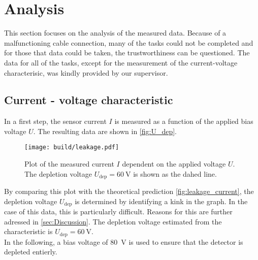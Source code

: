 \section{Analysis}
\label{sec:Analysis}
This section focuses on the analysis of the measured data. Because of a malfunctioning cable connection, many of the tasks could not be completed and for those
that data could be taken, the trustworthiness can be questioned. The data for all of the tasks, except for the measurement of the current-voltage characterisic,
was kindly provided by our supervisor.

\subsection{Current - voltage characteristic}
\label{sec:current-voltage characterisic}
In a first step, the sensor current $I$ is measured as a function of the applied bias voltage $U$. The resulting data are shown in \autoref{fig:U_dep}.
\begin{figure}
    \centering
    \texttt{[image: build/leakage.pdf]}
    \caption{Plot of the measured current $I$ dependent on the applied voltage $U$. The depletion voltage $U_{\mathrm{dep}} = \qty{60}{\volt}$ is shown as
    the dahed line.}
    \label{fig:U_dep}
\end{figure}
By comparing this plot with the theoretical prediction \autoref{fig:leakage_current}, the depletion voltage $U_{\mathrm{dep}}$ is determined by identifying a kink
in the graph. In the case of this data, this is particularly difficult. Reasons for this are further adressed in \autoref{sec:Discussion}. The depletion voltage
estimated from the characteristic is $U_\mathrm{dep} = \qty{60}{\volt}$.\\
In the following, a bias voltage of \qty{80}{\volt} is used to ensure that the detector is depleted entierly.

